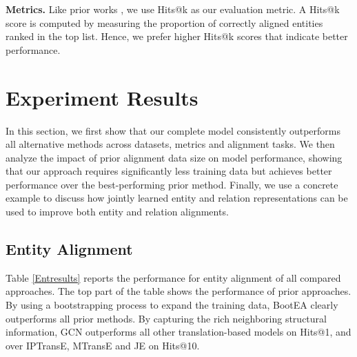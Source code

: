 \documentclass[11pt,a4paper]{article}
\newcommand\cparagraph[1]{\vspace{1mm}\noindent\textbf{#1.}}
\begin{document}
\cparagraph{Metrics} Like prior works \cite{sun2017cross,D18-1032,ijcai2018-611}, we use Hits@k as our evaluation metric. A Hits@k score is computed by measuring the proportion of correctly aligned entities ranked in the top  list. Hence, we prefer higher Hits@k scores that indicate better performance.  


\section{Experiment Results\label{sec:results}}
In this section, we first show that our complete model consistently outperforms all alternative methods across datasets,
metrics and alignment tasks. We then analyze the impact of prior alignment data size on model performance, showing that our approach
requires significantly less training data but achieves better performance over the best-performing prior method. Finally, we use a concrete
example to discuss how jointly learned entity and relation representations can be used to improve both entity and relation alignments.



\subsection{Entity Alignment\label{sec:result:ea}}
Table \ref{Entresults} reports the performance for entity alignment of all compared approaches. The top part of the table shows the
performance of prior approaches. By using a bootstrapping process to expand the training data, BootEA clearly outperforms all prior
methods. By capturing the rich neighboring structural information, GCN outperforms all other translation-based models on Hits@1, and over IPTransE, MTransE and
JE on Hits@10.
\end{document}
